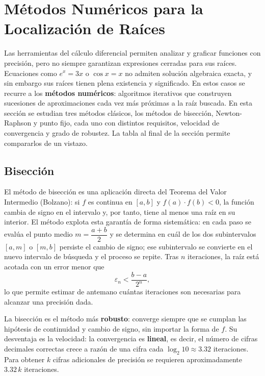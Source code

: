 \section{Métodos Numéricos para la Localización de Raíces}

Las herramientas del cálculo diferencial permiten analizar y graficar
funciones con precisión, pero no siempre garantizan expresiones cerradas
para sus raíces. Ecuaciones como $e^x = 3x$ o $\cos x = x$ no admiten
solución algebraica exacta, y sin embargo sus raíces tienen plena
existencia y significado. En estos casos se recurre a los
\textbf{métodos numéricos}: algoritmos iterativos que construyen
sucesiones de aproximaciones cada vez más próximas a la raíz buscada.
En esta sección se estudian tres métodos clásicos, los métodos de bisección,
Newton-Raphson y punto fijo, cada uno con distintos requisitos,
velocidad de convergencia y grado de robustez. La tabla al final de la
sección permite compararlos de un vistazo.

\subsection{Bisección}

El método de bisección es una aplicación directa del Teorema del Valor
Intermedio (Bolzano): si $f$ es continua en $[a,b]$ y $f(a)\cdot
f(b)<0$, la función cambia de signo en el intervalo y, por tanto,
tiene al menos una raíz en su interior. El método explota esta
garantía de forma sistemática: en cada paso se evalúa el punto medio
$m=\dfrac{a+b}{2}$ y se determina en cuál de los dos subintervalos
$[a,m]$ o $[m,b]$ persiste el cambio de signo; ese subintervalo se
convierte en el nuevo intervalo de búsqueda y el proceso se repite.
Tras $n$ iteraciones, la raíz está acotada con un error menor que
\[
\varepsilon_n < \frac{b-a}{2^n},
\]
lo que permite estimar de antemano cuántas iteraciones son necesarias
para alcanzar una precisión dada.

\begin{rem}
La bisección es el método más \textbf{robusto}: converge siempre que
se cumplan las hipótesis de continuidad y cambio de signo, sin importar
la forma de $f$. Su desventaja es la velocidad: la convergencia es
\textbf{lineal}, es decir, el número de cifras decimales correctas
crece a razón de una cifra cada $\log_2 10 \approx 3.32$ iteraciones.
Para obtener $k$ cifras adicionales de precisión se requieren
aproximadamente $3.32\,k$ iteraciones.
\end{rem}

